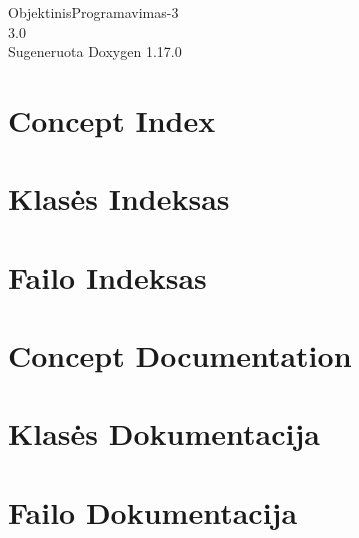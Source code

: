\documentclass[twoside]{book}
\newcommand{\+}{\discretionary{\mbox{\scriptsize$\hookleftarrow$}}{}{}}
\newcommand{\clearemptydoublepage}{%
    \newpage{\pagestyle{empty}\cleardoublepage}%
  }
\begin{document}
  \raggedbottom
    \hypersetup{pageanchor=false,
                bookmarksnumbered=true,
                pdfencoding=unicode
               }
  \begin{titlepage}
  \vspace*{7cm}
  \begin{center}%
  {\Large Objektinis\+Programavimas-\/3}\\
  [1ex]\large 3.\+0 \\
  \vspace*{1cm}
  {\large Sugeneruota Doxygen 1.17.0}\\
  \end{center}
  \end{titlepage}
  \clearemptydoublepage
  \tableofcontents
  \clearemptydoublepage
  \hypersetup{pageanchor=true}
\chapter{Concept Index}

\chapter{Klasės Indeksas}

\chapter{Failo Indeksas}

\chapter{Concept Documentation}

\chapter{Klasės Dokumentacija}

\chapter{Failo Dokumentacija}


  \backmatter
  \newpage
  \clearemptydoublepage
  \printindex
\end{document}
